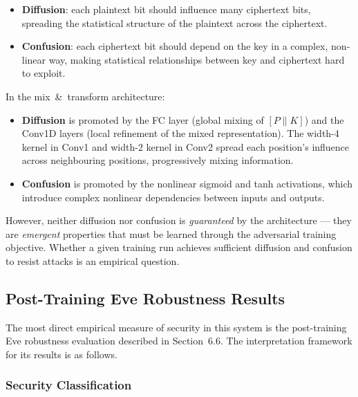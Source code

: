 \documentclass[12pt, a4paper]{article}
\begin{document}
\begin{itemize}[leftmargin=1.8em, itemsep=4pt]
  \item \textbf{Diffusion}: each plaintext bit should influence many
        ciphertext bits, spreading the statistical structure of the
        plaintext across the ciphertext.
  \item \textbf{Confusion}: each ciphertext bit should depend on the
        key in a complex, non-linear way, making statistical
        relationships between key and ciphertext hard to exploit.
\end{itemize}

In the mix~\&~transform architecture:

\begin{itemize}[leftmargin=1.8em, itemsep=4pt]
  \item \textbf{Diffusion} is promoted by the FC layer (global mixing
        of $[P \| K]$) and the Conv1D layers (local refinement of the
        mixed representation). The width-4 kernel in Conv1 and
        width-2 kernel in Conv2 spread each position's influence
        across neighbouring positions, progressively mixing information.
  \item \textbf{Confusion} is promoted by the nonlinear sigmoid and
        tanh activations, which introduce complex nonlinear dependencies
        between inputs and outputs.
\end{itemize}

However, neither diffusion nor confusion is \emph{guaranteed} by the
architecture --- they are \emph{emergent} properties that must be
learned through the adversarial training objective. Whether a given
training run achieves sufficient diffusion and confusion to resist
attacks is an empirical question.

\subsection{Post-Training Eve Robustness Results}
\label{subsec:robustness_results}

The most direct empirical measure of security in this system is the
post-training Eve robustness evaluation described in Section~6.6.
The interpretation framework for its results is as follows.

\subsubsection*{Security Classification}
\end{document}
